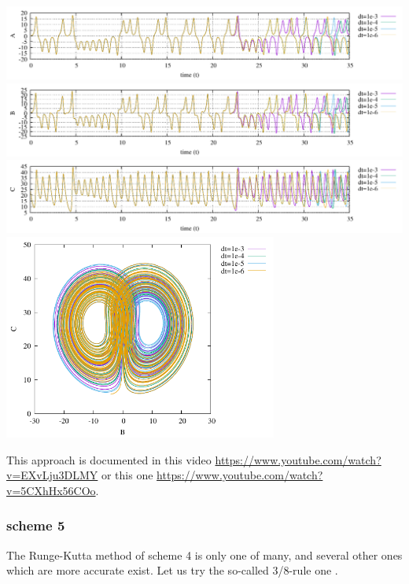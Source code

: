 \begin{center}
\includegraphics[width=16cm]{python_codes/fieldstone_156/results/scheme4/A.pdf}\\
\includegraphics[width=16cm]{python_codes/fieldstone_156/results/scheme4/B.pdf}\\
\includegraphics[width=16cm]{python_codes/fieldstone_156/results/scheme4/C.pdf}\\
\includegraphics[width=9cm]{python_codes/fieldstone_156/results/scheme4/BC.pdf}
\end{center}

This approach is documented in this video \url{https://www.youtube.com/watch?v=EXvLju3DLMY}
or this one \url{https://www.youtube.com/watch?v=5CXhHx56COo}.

\subsubsection*{scheme 5}

The Runge-Kutta method of scheme 4 is only one of many, and several other ones which are 
more accurate exist. 
Let us try the so-called 3/8-rule one .

